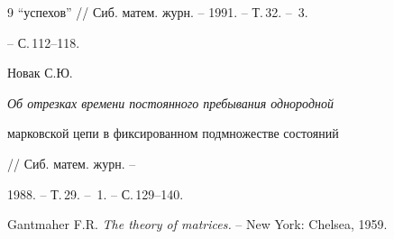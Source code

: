 \begin{thebibliography}{9}
{``успехов''} // Сиб. матем. журн. -- 1991. -- Т.\,32. -- \No\,3. 


-- С.\,112--118. 


 




Новак С.Ю. {\em Об отрезках времени постоянного пребывания однородной 


марковской цепи в фиксированном подмножестве состояний} 


// Сиб. матем. журн. -- 


1988. -- Т.\,29. -- \No\,1. -- С.\,129--140. 


 




Gantmaher F.R. {\em The theory of matrices.} -- New York: Chelsea, 1959. 


 


\end{thebibliography} 


 


\vskip 2cm 


 








 


 


